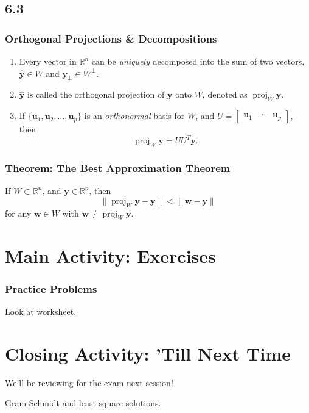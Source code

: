 \documentclass{beamer}
\renewcommand{\vec}[1]{\mathbf{#1}}
\begin{document}
	\subsection{6.3}
	\begin{frame}
		\frametitle{Orthogonal Projections \& Decompositions}
		\begin{enumerate}
			\item<1-> Every vector in \(\mathbb{R}^n\) can be \emph{uniquely} decomposed into the sum of two vectors, \(\vec{\hat{y}} \in W\) and \(\vec{y}_{\perp} \in W^\perp\).
			\item<2-> \(\vec{\hat{y}}\) is called the orthogonal projection of \(\vec{y}\) onto \(W\), denoted as \(\operatorname{proj}_{W}\vec{y}\).
			\item<3-> If \(\{\vec{u}_1, \vec{u}_2, \dots, \vec{u}_p\}\) is an \emph{orthonormal} basis for \(W\), and \(U = \begin{bmatrix}\vec{u}_1 & \cdots & \vec{u}_p\end{bmatrix},\) then \[\operatorname{proj}_W \vec{y} = UU^T \vec{y}.\]
		\end{enumerate}
	\end{frame}

	\begin{frame}
		\frametitle{Theorem: The Best Approximation Theorem}

		\begin{theorem}
			If \(W \subset \mathbb{R}^{n}\), and \(\vec{y} \in \mathbb{R}^n\), then 
			\[\|\operatorname{proj}_W\vec{y} - \vec{y} \| < \|\vec{w} - \vec{y}\|\]
			for any \(\vec{w} \in W\) with \(\vec{w} \ne \operatorname{proj}_W\vec{y}.\)
		\end{theorem}

	\end{frame}

	\section{Main Activity: Exercises}
	\begin{frame}
		\frametitle{Practice Problems}
		Look at worksheet.
	\end{frame}

	\section{Closing Activity: 'Till Next Time}
	\begin{frame}
		We'll be reviewing for the exam next session! \pause

		Gram-Schmidt and least-square solutions.
	\end{frame}
	
\end{document}
